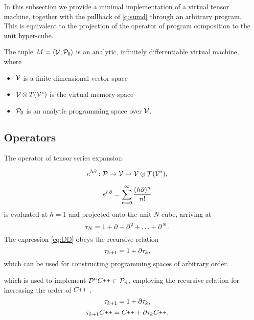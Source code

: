 In this subsection we provide a minimal implementation of a virtual tensor machine, together with the pullback of \eqref{q:sumd} through an arbitrary program. This is equivalent to the projection of the operator of program composition to the unit hyper-cube. 

\begin{definicija}
The tuple $M=\langle \mathcal{V},\mathcal{P}_0\rangle$ is an analytic, infinitely  differentiable virtual machine, where
   
    \begin{itemize}
    \item
    $\mathcal{V}$ is a finite dimensional vector space
    \item
    $\mathcal{V}\otimes T(\mathcal{V}^*)$ is the virtual memory space
    \item
    $\mathcal{P}_0$ is an analytic programming space over $\mathcal{V}$.
    \end{itemize}
  \end{definicija}

  \subsection{Operators}\label{sec:operators}

The operator of tensor series expansion \cite[Theorem~5.1]{OperationalCalculus}

\begin{equation}\label{eq:specProg}
            e^{h\partial}:\mathcal{P}\to\mathcal{V}\to \mathcal{V}\otimes \mathcal{T}(\mathcal{V}^*),
          \end{equation}

\begin{equation}
  e^{h\partial}=\sum\limits_{n=0}^{\infty}\frac{(h\partial)^n}{n!}
 \end{equation}
 is evaluated at $h=1$ and projected onto the unit $N$-cube, arriving at 
\begin{equation}\label{eq:DD}
    \tau_N = 1+\partial +\partial^2 +\ldots + \partial^N.
  \end{equation}
The expression \eqref{eq:DD} obeys the recursive relation
\begin{equation}
      \label{eq:rekurzija}
      \tau_{k+1} = 1+\partial\tau_k,
    \end{equation}
which can be used for constructing programming spaces of arbitrary order.


which is used to implement $\DD^n\CC\subset\dP_n$, employing the recursive relation for increasing the order of $\CC$ \cite[Proposition~5.1]{OperationalCalculus}.
\begin{equation}
      \label{eq:rekurzija}
      \tau_{k+1} = 1+\partial\tau_k,
    \end{equation}
\begin{equation}
\sumd_{k+1}\CC = \CC+\D\sumd_k\CC.
\end{equation}
        
